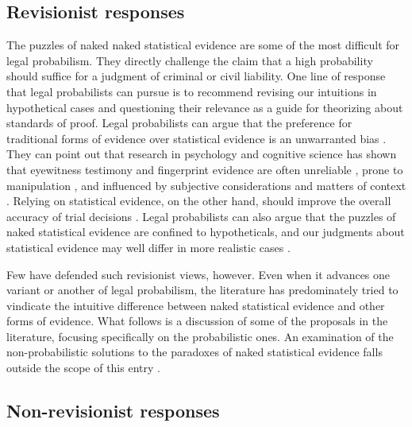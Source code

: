 \documentclass{article}
\begin{document}
\subsection{Revisionist responses}

The puzzles of naked naked statistical evidence are some of the most difficult for legal probabilism. They directly challenge the claim that a high probability should suffice for a judgment  of criminal or civil liability.  One line of  response  that legal probabilists can pursue is to recommend revising our intuitions in hypothetical cases and questioning their relevance as a guide for theorizing about  standards of proof.
Legal probabilists can argue that the preference for traditional forms of evidence over statistical evidence is an unwarranted bias \citep{laudan2006truth, papineau2019}.
They can point out that research in psychology and cognitive science has shown that eyewitness testimony and fingerprint evidence are often unreliable \citep{Simons1999Gorillas},  prone to manipulation \citep{Loftus1996}, and influenced  by subjective considerations and matters of context \citep{Dror2006, Zabell2005Fingerprint-Evi}. 
Relying on statistical  evidence, on the other hand, should improve the overall accuracy of trial decisions \citep{Koehler1990Veridical-Verdi}. 
Legal probabilists can also argue that the puzzles of naked statistical evidence are confined to hypotheticals, and our judgments about statistical evidence  may well differ in more realistic cases \citep{HeddenColyvan2019legal, ross2020}.


 Few have defended such revisionist views, however. Even when it advances one variant or another of legal probabilism, the literature has predominately tried to vindicate the intuitive difference between naked statistical evidence and other forms of evidence. %
What follows is a discussion of some of the proposals in the literature, focusing specifically on the probabilistic ones. An examination of the non-probabilistic solutions to the paradoxes of naked statistical evidence falls outside the scope of this entry 
\cite[for  critical surveys, see][]{redmayne2008exploring,gardiner2018,pardo2019}.


\subsection{Non-revisionist responses}
\end{document}
